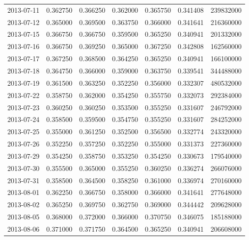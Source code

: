 \begin{tabular}{lrrrrrr}
2013-07-11 &    0.362750 &    0.366250 &    0.362000 &    0.365750 &    0.341408 &   239832000 \\
2013-07-12 &    0.365000 &    0.369500 &    0.363750 &    0.366000 &    0.341641 &   216360000 \\
2013-07-15 &    0.366750 &    0.366750 &    0.359500 &    0.365250 &    0.340941 &   201332000 \\
2013-07-16 &    0.366750 &    0.369250 &    0.365000 &    0.367250 &    0.342808 &   162560000 \\
2013-07-17 &    0.367250 &    0.368500 &    0.364250 &    0.365250 &    0.340941 &   166100000 \\
2013-07-18 &    0.364750 &    0.366000 &    0.359000 &    0.363750 &    0.339541 &   344488000 \\
2013-07-19 &    0.361500 &    0.363250 &    0.352250 &    0.356000 &    0.332307 &   480532000 \\
2013-07-22 &    0.358750 &    0.362000 &    0.354250 &    0.355750 &    0.332073 &   292384000 \\
2013-07-23 &    0.360250 &    0.360250 &    0.353500 &    0.355250 &    0.331607 &   246792000 \\
2013-07-24 &    0.358500 &    0.359500 &    0.354750 &    0.355250 &    0.331607 &   284252000 \\
2013-07-25 &    0.355000 &    0.361250 &    0.352500 &    0.356500 &    0.332774 &   243320000 \\
2013-07-26 &    0.352250 &    0.357250 &    0.352250 &    0.355000 &    0.331373 &   227360000 \\
2013-07-29 &    0.354250 &    0.358750 &    0.353250 &    0.354250 &    0.330673 &   179540000 \\
2013-07-30 &    0.355500 &    0.365000 &    0.355250 &    0.360250 &    0.336274 &   266076000 \\
2013-07-31 &    0.358500 &    0.364500 &    0.358250 &    0.361000 &    0.336974 &   270160000 \\
2013-08-01 &    0.362250 &    0.366750 &    0.358000 &    0.366000 &    0.341641 &   277648000 \\
2013-08-02 &    0.365250 &    0.369750 &    0.362750 &    0.369000 &    0.344442 &   209628000 \\
2013-08-05 &    0.368000 &    0.372000 &    0.366000 &    0.370750 &    0.346075 &   185188000 \\
2013-08-06 &    0.371000 &    0.371750 &    0.364500 &    0.365250 &    0.340941 &   206608000 \\

\end{tabular}
